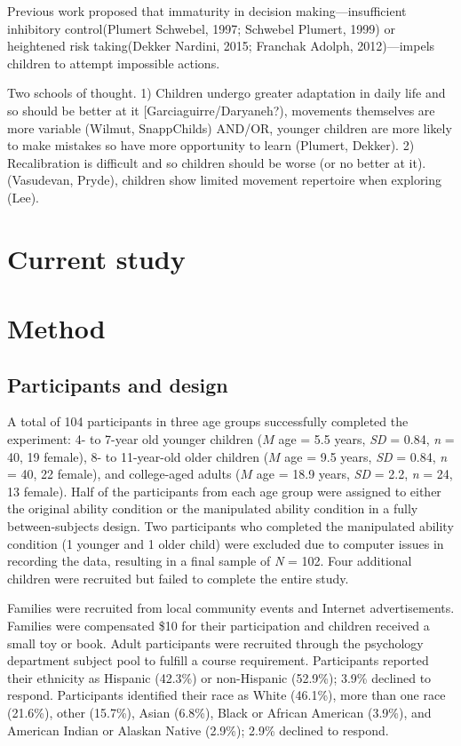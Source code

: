 \documentclass[a4paper,man,natbib,floatsintext,noextraspace]{apa6}
\begin{document}
Previous work proposed that immaturity in decision making—insufficient inhibitory control(Plumert  Schwebel, 1997; Schwebel  Plumert, 1999) or heightened risk taking(Dekker  Nardini, 2015; Franchak  Adolph, 2012)—impels children to attempt impossible actions. 

Two schools of thought. 1) Children undergo greater adaptation in daily life and so should be better at it [Garciaguirre/Daryaneh?), movements themselves are more variable (Wilmut, SnappChilds) AND/OR, younger children are more likely to make mistakes so have more opportunity to learn (Plumert, Dekker). 2) Recalibration is difficult and so children should be worse (or no better at it). (Vasudevan, Pryde), children show limited movement repertoire when exploring (Lee).

\section{Current study}

\section{Method}

\subsection{Participants and design}

A total of 104 participants in three age groups successfully completed the experiment: 4- to 7-year old younger children ($M$ age = 5.5 years, \textit{SD} = 0.84, \textit{n} = 40, 19 female), 8- to 11-year-old older children ($M$ age = 9.5 years, \textit{SD} = 0.84, \textit{n} = 40, 22 female), and college-aged adults ($M$ age = 18.9 years, \textit{SD} = 2.2, \textit{n} = 24, 13 female). Half of the participants from each age group were assigned to either the original ability condition or the manipulated ability condition in a fully between-subjects design. Two participants who completed the manipulated ability condition (1 younger and 1 older child) were excluded due to computer issues in recording the data, resulting in a final sample of \textit{N} = 102. Four additional children were recruited but failed to complete the entire study. 

Families were recruited from local community events and Internet advertisements. Families were compensated \$10 for their participation and children received a small toy or book. Adult participants were recruited through the psychology department subject pool to fulfill a course requirement. Participants reported their ethnicity as Hispanic (42.3\%) or non-Hispanic (52.9\%); 3.9\% declined to respond. Participants identified their race as White (46.1\%), more than one race (21.6\%), other (15.7\%), Asian (6.8\%), Black or African American (3.9\%), and American Indian or Alaskan Native (2.9\%); 2.9\% declined to respond.
\end{document}
